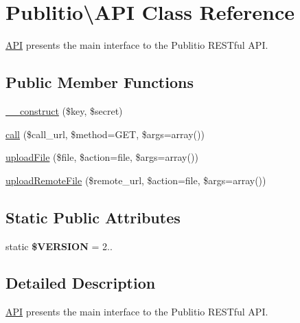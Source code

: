 \hypertarget{classPublitio_1_1API}{}\section{Publitio\textbackslash{}A\+PI Class Reference}
\label{classPublitio_1_1API}


\hyperlink{classPublitio_1_1API}{A\+PI} presents the main interface to the Publitio R\+E\+S\+Tful A\+PI.  


\subsection*{Public Member Functions}
\begin{DoxyCompactItemize}
\item 
\hyperlink{classPublitio_1_1API_af80d6037cdea9ea685abb5db6ed68b3c}{\+\_\+\+\_\+construct} (\$key, \$secret)
\item 
\hyperlink{classPublitio_1_1API_ae58db8a70b7f72d7b16aa1dea4f9a292}{call} (\$call\+\_\+url, \$method=\textquotesingle{}G\+ET\textquotesingle{}, \$args=array())
\item 
\hyperlink{classPublitio_1_1API_a05a6ab443cb16c2ef3be2a3f2c434d7b}{upload\+File} (\$file, \$action=\textquotesingle{}file\textquotesingle{}, \$args=array())
\item 
\hyperlink{classPublitio_1_1API_ab5b9b82b9b26449fcbbc023cab0c389a}{upload\+Remote\+File} (\$remote\+\_\+url, \$action=\textquotesingle{}file\textquotesingle{}, \$args=array())
\end{DoxyCompactItemize}
\subsection*{Static Public Attributes}
\begin{DoxyCompactItemize}
\item 
\mbox{\label{classPublitio_1_1API_aab29941f3090b73c32c40a07adfb204a}} 
static {\bfseries \$\+V\+E\+R\+S\+I\+ON} = \textquotesingle{}2..\textquotesingle{}
\end{DoxyCompactItemize}


\subsection{Detailed Description}
\hyperlink{classPublitio_1_1API}{A\+PI} presents the main interface to the Publitio R\+E\+S\+Tful A\+PI. 

